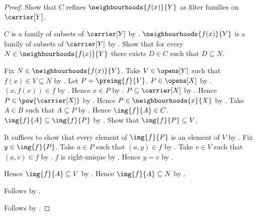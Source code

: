 \begin{proof}
    Show that $C$ refines $\neighbourhoods{f(x)}{Y}$
        as filter families on $\carrier[Y]$.
    \begin{subproof}
        $C$ is a family of subsets of $\carrier[Y]$
            by .
        $\neighbourhoods{f(x)}{Y}$ is a family of subsets of $\carrier[Y]$
            by .
        Show that for every $N\in\neighbourhoods{f(x)}{Y}$ there exists
            $D\in C$ such that $D\subseteq N$.
        \begin{subproof}
            Fix $N\in\neighbourhoods{f(x)}{Y}$.
            Take $V\in\opens[Y]$ such that $f(x)\in V\subseteq N$
                by .
            Let $P=\preimg{f}{V}$.
            $P\in\opens[X]$ by .
            $(x,f(x))\in f$ by .
            Hence $x\in P$ by .
            $P\subseteq\carrier[X]$ by .
            Hence $P\in\pow{\carrier[X]}$ by .
            Hence $P\in\neighbourhoods{x}{X}$
                by .
            Take $A\in B$ such that $A\subseteq P$
                by .
            Hence $\img{f}{A}\in C$.
            $\img{f}{A}\subseteq\img{f}{P}$ by .
            Show that $\img{f}{P}\subseteq V$.
            \begin{subproof}
                It suffices to show that every element of $\img{f}{P}$
                    is an element of $V$ by .
                Fix $y\in\img{f}{P}$.
                Take $a\in P$ such that $(a,y)\in f$
                    by .
                Take $v\in V$ such that $(a,v)\in f$
                    by .
                $f$ is right-unique by .
                Hence $y=v$ by .
            \end{subproof}
            Hence $\img{f}{A}\subseteq V$
                by .
            Hence $\img{f}{A}\subseteq N$
                by .
        \end{subproof}
        Follows by .
    \end{subproof}
    Follows by .
\end{proof}

